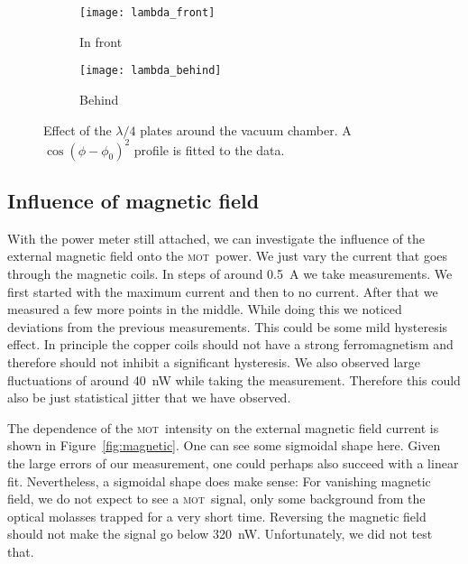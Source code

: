 \documentclass[11pt, english, fleqn, DIV=15, headinclude, BCOR=2cm]{scrreprt}
\newcommand\mot{\textsc{mot}}
\begin{document}
\begin{figure}
    \centering
    \begin{subfigure}[c]{0.48\linewidth}
    \centering
    \texttt{[image: lambda\_front]}
    \caption{%
        In front
    }
    \label{fig:lambda_front}
    \end{subfigure}
    \hfill
    \begin{subfigure}[c]{0.48\linewidth}
    \centering
    \texttt{[image: lambda\_behind]}
    \caption{%
        Behind
    }
    \label{fig:lambda_behind}
    \end{subfigure}
    \caption{%
        Effect of the $\lambda/4$ plates around the vacuum chamber.
        A $\cos(\phi - \phi_0)^2$ profile is fitted to the data.
    }
    \label{fig:}
\end{figure}

\subsection{Influence of magnetic field}

With the power meter still attached, we can investigate the influence of the
external magnetic field onto the \mot\ power. We just vary the current that
goes through the magnetic coils. In steps of around \SI{0.5}{\ampere} we take
measurements. We first started with the maximum current and then to no current.
After that we measured a few more points in the middle. While doing this we
noticed deviations from the previous measurements. This could be some mild
hysteresis effect. In principle the copper coils should not have a strong
ferromagnetism and therefore should not inhibit a significant hysteresis. We
also observed large fluctuations of around \SI{40}{\nano\watt} while taking the
measurement. Therefore this could also be just statistical jitter that we have
observed.



The dependence of the \mot\ intensity on the external magnetic field current is
shown in Figure~\ref{fig:magnetic}. One can see some sigmoidal shape here.
Given the large errors of our measurement, one could perhaps also succeed with
a linear fit. Nevertheless, a sigmoidal shape does make sense: For vanishing
magnetic field, we do not expect to see a \mot\ signal, only some background
from the optical molasses trapped for a very short time. Reversing the magnetic
field should not make the signal go below \SI{320}{\nano\watt}.
Unfortunately, we did not test that.
\end{document}
